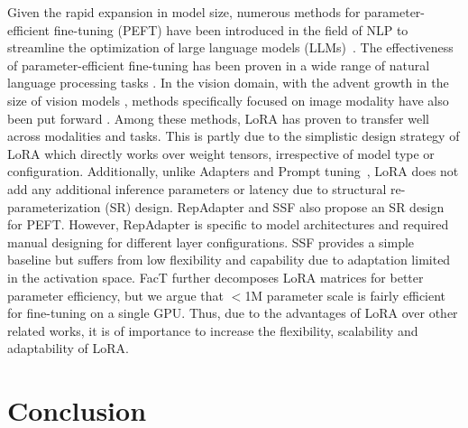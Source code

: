 Given the rapid expansion in model size, numerous methods for parameter-efficient fine-tuning (PEFT) have been introduced in the field of NLP to streamline the optimization of large language models (LLMs)~\citep{DBLP:journals/corr/abs-2110-07602, zhangadaptive, hulora, liu2021gpt, li-liang-2021-prefix, lester2021power, zaken2022bitfit, houlsby2019parameter}. The effectiveness of parameter-efficient fine-tuning has been proven in a wide range of natural language processing tasks \citep{fu2022effectiveness,he2021towards}. In the vision domain, with the advent growth in the size of vision models \citep{dehghani2023scaling, kolesnikov2020big}, methods specifically focused on image modality have also been put forward \citep{jie2022fact, lian2022scaling, chen2022adaptformer, luo2023towards, zhang2022neural, jia2022visual, he2023sensitivityaware}. Among these methods, LoRA \citep{hulora} has proven to transfer well across modalities and tasks. This is partly due to the simplistic design strategy of LoRA which directly works over weight tensors, irrespective of model type or configuration. Additionally, unlike Adapters \citep{houlsby2019parameter, chen2022adaptformer} and Prompt tuning~\citep{jia2022visual}, LoRA does not add any additional inference parameters or latency due to structural re-parameterization (SR) design. RepAdapter \citep{luo2023towards} and SSF \citep{lian2022scaling} also propose an SR design for PEFT. However, RepAdapter is specific to model architectures and required manual designing for different layer configurations. SSF provides a simple baseline but suffers from low flexibility and capability due to adaptation limited in the activation space. FacT \citep{jie2022fact} further decomposes LoRA matrices for better parameter efficiency, but we argue that $<$1M parameter scale is fairly efficient for fine-tuning on a single GPU. Thus, due to the advantages of LoRA over other related works, it is of importance to increase the flexibility, scalability and adaptability of LoRA.

\section{Conclusion}


